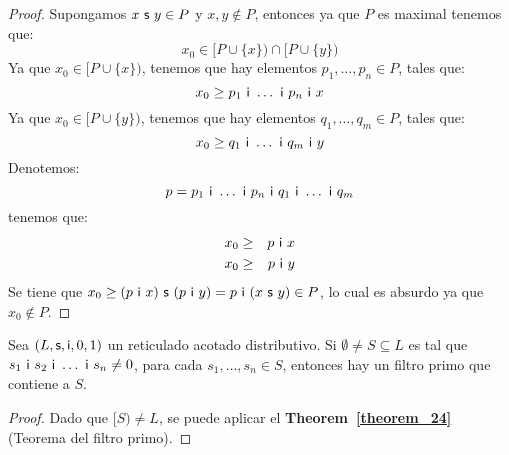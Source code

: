 \begin{proof}
    \vspace{2mm}
    \PN Supongamos $x \ \mathsf{s} \ y \in P$ y $x, y \notin P$, entonces ya que $P$ es maximal tenemos que:
    \[
      x_{0} \in \lbrack P \cup \{x\}) \cap \lbrack P \cup \{y\})
    \]
    \PN Ya que $x_{0} \in \lbrack P \cup \{x\})$, tenemos que hay elementos $p_{1}, \dotsc, p_{n} \in P$, tales que:
    \[
      x_{0} \geq p_{1} \ \mathsf{i} \ \dotsc \ \mathsf{i} \ p_{n} \ \mathsf{i} \ x
    \]
    \PN Ya que $x_{0} \in \lbrack P \cup \{y\})$, tenemos que hay elementos $q_{1}, \dotsc, q_{m} \in P$, tales que:
    \[
      x_{0} \geq q_{1} \ \mathsf{i} \ \dotsc \ \mathsf{i} \ q_{m} \ \mathsf{i} \ y
    \]
    \PN Denotemos:
    \[
      p = p_{1} \ \IN \ \dotsc \ \IN \ p_{n} \ \IN \ q_{1} \ \IN \  \dotsc \ \IN \ q_{m}
    \]
    \PN tenemos que:
    \begin{eqnarray*}
      x_{0} &\geq& p \ \mathsf{i} \ x \\
      x_{0} &\geq& p \ \mathsf{i} \ y
    \end{eqnarray*}
    \PN Se tiene que $x_{0} \geq (p \ \mathsf{i} \ x) \ \mathsf{s} \ (p \ \mathsf{i} \ y) = p \ \mathsf{i} \ (x \ \mathsf{s} \ y) \in P$, lo cual es
    absurdo ya que $x_{0} \notin P$.
  \end{proof}

  \begin{corollary} \label{corollary_25}
    \PN Sea $(L, \mathsf{s}, \mathsf{i}, 0, 1)$ un reticulado acotado distributivo. Si $\emptyset \neq S \subseteq L$ es tal que
    $s_{1} \ \mathsf{i} \ s_{2} \ \mathsf{i} \ \dotsc \ \mathsf{i} \ s_{n} \neq 0$, para cada $s_{1}, \dotsc, s_{n} \in S$, entonces hay un
    filtro primo que contiene a $S$.
  \end{corollary}
  \begin{proof}
    \PN Dado que $[S) \neq L$, se puede aplicar el \textbf{Theorem~\ref{theorem_24}} (Teorema del filtro primo).
  \end{proof}

